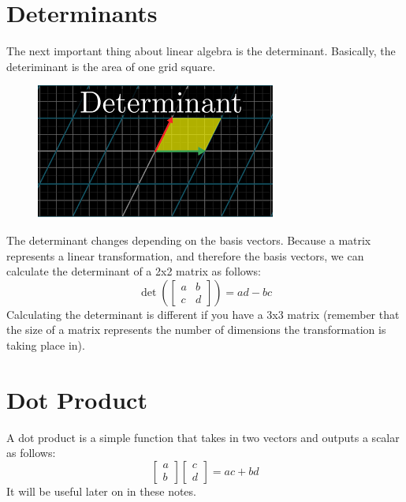 \section{Determinants}
The next important thing about linear algebra is the determinant. Basically, the deteriminant is the area of one grid square.
\begin{figure}[H]
\includegraphics{determinant.png}
\end{figure}
The determinant changes depending on the basis vectors. Because a matrix represents a linear transformation, and therefore the basis vectors, we can calculate the determinant of a 2x2 matrix as follows:
\begin{equation*}
\det\left(\begin{bmatrix}a&b\\c&d\end{bmatrix}\right)=ad-bc
\end{equation*}
Calculating the determinant is different if you have a 3x3 matrix (remember that the size of a matrix represents the number of dimensions the transformation is taking place in).
\section{Dot Product}
A dot product is a simple function that takes in two vectors and outputs a scalar as follows:
\begin{equation*}
\begin{bmatrix}a\\b\end{bmatrix}\begin{bmatrix}c\\d\end{bmatrix}=ac+bd
\end{equation*}
It will be useful later on in these notes.
